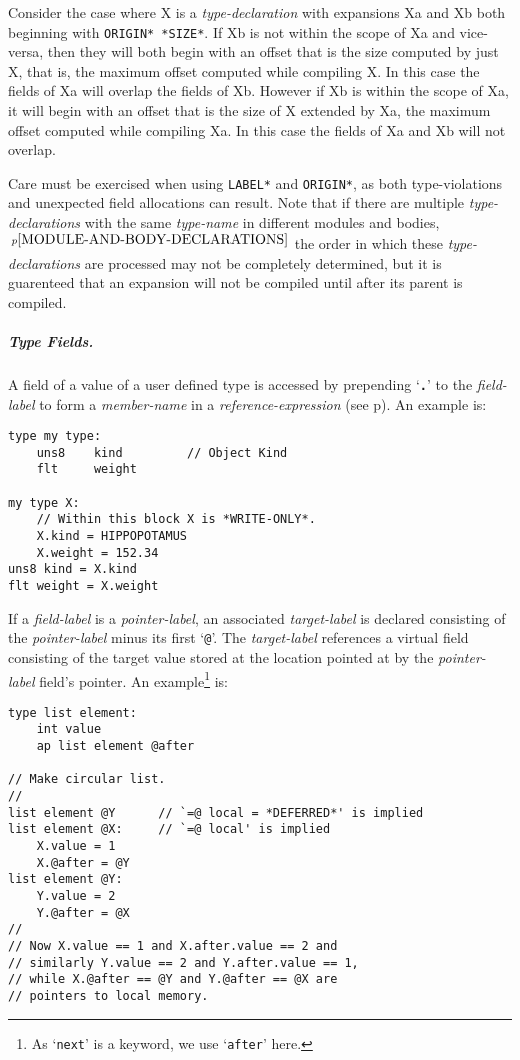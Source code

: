 \documentclass[12pt]{article}
\newcommand{\subsubsubsubsection}[1]{\subparagraph[#1]{#1.}}
\newcommand{\TT}[1]{{\tt \bfseries #1}}
\newcommand{\pagref}[1]{p\pageref{#1}}
\newcommand{\pagnote}[1]{$\,^{p\pageref{#1}}$}
\newenvironment{indpar}[1][0.3in]%
	{\begin{list}{}%
		     {\setlength{\itemsep}{0in}%
		      \setlength{\topsep}{0in}%
		      \setlength{\parsep}{1ex}%
		      \setlength{\labelwidth}{#1}%
		      \setlength{\leftmargin}{#1}%
		      \addtolength{\leftmargin}{\labelsep}}%
	 \item}%
	{\end{list}}
\begin{document}
Consider the case where X is a {\em type-declaration} with expansions
Xa and Xb both beginning with {\tt *ORIGIN* *SIZE*}.  If Xb is not
within the scope of Xa and vice-versa, then they will both begin
with an offset that is the size computed by just X, that is, the maximum
offset computed while compiling X.  In this case the fields of Xa will
overlap the fields of Xb.  However if
Xb is within the scope of Xa, it will begin with an offset that
is the size of X extended by Xa, the maximum offset computed while
compiling Xa.  In this case the fields of Xa and Xb will not overlap.

Care must be exercised when using {\tt *LABEL*} and {\tt *ORIGIN*},
as both type-violations and unexpected field allocations can result.
Note that if there are multiple {\em type-declarations}
with the same {\em type-name} in different
modules and bodies,\pagnote{MODULE-AND-BODY-DECLARATIONS}
the order in which these {\em type-declarations} are processed
may not be completely determined, but it is guarenteed that
an expansion will not be compiled until after its parent is compiled.

\subsubsubsubsection{Type Fields}

A field of a value of a user defined type is accessed by prepending
`\TT{.}' to the {\em field-label} to form a {\em member-name} in
a {\em reference-expression} (see \pagref{FIELD-SELECTION}).
An example is:

\begin{indpar}\begin{verbatim}
type my type:
    uns8    kind         // Object Kind
    flt     weight

my type X:
    // Within this block X is *WRITE-ONLY*.
    X.kind = HIPPOPOTAMUS
    X.weight = 152.34
uns8 kind = X.kind
flt weight = X.weight
\end{verbatim}\end{indpar}

If a {\em field-label} is a {\em pointer-label}, an
associated {\em target-label} is declared consisting of the
{\em pointer-label} minus its first `{\tt @}'.  The {\em target-label}
references a virtual field consisting of the target value stored
at the location pointed at by the {\em pointer-label} field's pointer.
An example\footnote{As `{\tt next}' is a keyword, we use `{\tt after}'
here.} is:

\begin{indpar}\begin{verbatim}
type list element:
    int value
    ap list element @after

// Make circular list.
//
list element @Y      // `=@ local = *DEFERRED*' is implied
list element @X:     // `=@ local' is implied
    X.value = 1
    X.@after = @Y
list element @Y:
    Y.value = 2
    Y.@after = @X
//
// Now X.value == 1 and X.after.value == 2 and
// similarly Y.value == 2 and Y.after.value == 1,
// while X.@after == @Y and Y.@after == @X are
// pointers to local memory.
\end{verbatim}\end{indpar}
\end{document}
